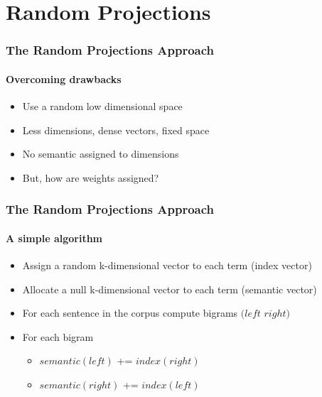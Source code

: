 \documentclass{beamer}
\begin{document}
\section{Random Projections}

\begin{frame}
	\frametitle{The Random Projections Approach}
	\framesubtitle{Overcoming drawbacks}
	\begin{itemize}
	\item Use a random low dimensional space
	\item Less dimensions, dense vectors, fixed space
	\item No semantic assigned to dimensions
	\item But, how are weights assigned?
	\end{itemize}
\end{frame}

\begin{frame}
	\frametitle{The Random Projections Approach}
	\framesubtitle{A simple algorithm }
	\begin{itemize}
		\item Assign a random k-dimensional vector to each term (index vector)
		\item Allocate a null k-dimensional vector to each term (semantic vector)
		\item For each sentence in the corpus compute bigrams $(left$ $right)$
		\item For each bigram 
		\begin{itemize}
		  \item $semantic(left)$ += $index(right)$
		  \item $semantic(right)$ += $index(left)$
		\end{itemize}
	\end{itemize}
\end{frame}	
\end{document}
